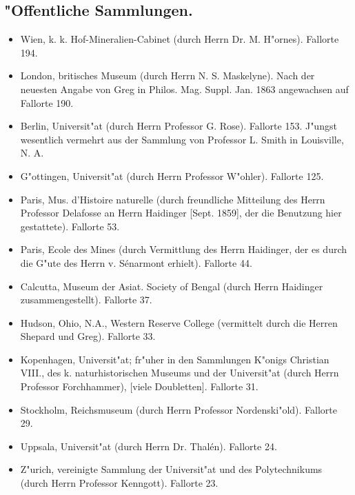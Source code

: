 \documentclass[a4paper, 11pt, oneside]{article}
\begin{document}
\subsection*{"Offentliche Sammlungen.}
\begin{itemize}
    \item Wien, k. k. Hof-Mineralien-Cabinet (durch Herrn Dr. M. H"ornes). Fallorte 194.

    \item London, britisches Museum (durch Herrn N. S. Maskelyne). Nach der neuesten Angabe von Greg in Philos. Mag. Suppl. Jan. 1863 angewachsen auf Fallorte 190.

    \item Berlin, Universit"at (durch Herrn Professor G. Rose). Fallorte 153. J"ungst wesentlich vermehrt aus der Sammlung von Professor L. Smith in Louisville, N. A.

    \item G"ottingen, Universit"at (durch Herrn Professor W"ohler). Fallorte 125.

    \item Paris, Mus. d'Histoire naturelle (durch freundliche Mitteilung des Herrn Professor Delafosse an Herrn Haidinger [Sept. 1859], der die Benutzung hier gestattete). Fallorte 53.

    \item Paris, Ecole des Mines (durch Vermittlung des Herrn Haidinger, der es durch die G"ute des Herrn v. Sénarmont erhielt). Fallorte 44.

    \item Calcutta, Museum der Asiat. Society of Bengal (durch Herrn Haidinger zusammengestellt). Fallorte 37.

    \item Hudson, Ohio, N.A., Western Reserve College (vermittelt durch die Herren Shepard und Greg). Fallorte 33.

    \item Kopenhagen, Universit"at; fr"uher in den Sammlungen K"onigs Christian VIII., des k. naturhistorischen Museums und der Universit"at (durch Herrn Professor Forchhammer), [viele Doubletten]. Fallorte 31.

    \item Stockholm, Reichsmuseum (durch Herrn Professor Nordenski"old). Fallorte 29.

    \item Uppsala, Universit"at (durch Herrn Dr. Thalén). Fallorte 24.

    \item Z"urich, vereinigte Sammlung der Universit"at und des Polytechnikums (durch Herrn Professor Kenngott). Fallorte 23.


\end{itemize}
\end{document}

